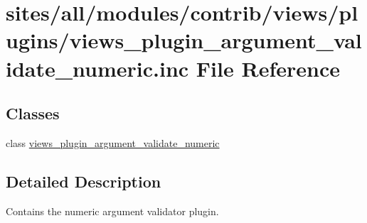 \hypertarget{views__plugin__argument__validate__numeric_8inc}{
\section{sites/all/modules/contrib/views/plugins/views\_\-plugin\_\-argument\_\-validate\_\-numeric.inc File Reference}
\label{views__plugin__argument__validate__numeric_8inc}
}
\subsection*{Classes}
\begin{CompactItemize}
\item 
class \hyperlink{classviews__plugin__argument__validate__numeric}{views\_\-plugin\_\-argument\_\-validate\_\-numeric}
\end{CompactItemize}


\subsection{Detailed Description}
Contains the numeric argument validator plugin. 